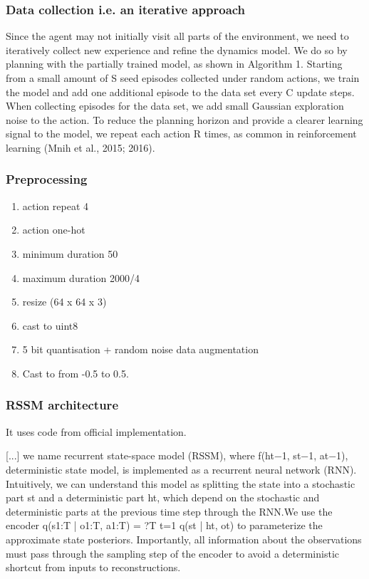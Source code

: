 \subsubsection{Data collection i.e. an iterative approach}
Since the agent may not initially visit all parts of the environment, we need to iteratively collect new experience and refine the dynamics model. We do so by planning with the partially trained model, as shown in Algorithm 1. Starting from a small amount of S seed episodes collected under random actions, we train the model and add one additional episode to the data set every C update steps. When collecting episodes for the data set, we add small Gaussian exploration noise to the action. To reduce the planning horizon and provide a clearer learning signal to the model, we repeat each action R times, as common in reinforcement learning (Mnih et al., 2015; 2016).

\subsubsection{Preprocessing}
\begin{enumerate}
\item action repeat 4
\item action one-hot
\item minimum duration 50
\item maximum duration 2000/4
\item resize (64 x 64 x 3)
\item cast to uint8
\item 5 bit quantisation + random noise data augmentation
\item Cast to from -0.5 to 0.5.
  
\end{enumerate}

\subsubsection{RSSM architecture}
It uses code from official implementation.


[...] we name recurrent state-space model (RSSM), where f(ht−1, st−1, at−1), deterministic state model, is implemented as a recurrent neural network (RNN). Intuitively, we can understand this model as splitting the state into a stochastic part st and a deterministic part ht, which depend on the stochastic and deterministic parts at the previous time step through the RNN.We use the encoder q(s1:T | o1:T, a1:T) =
?T t=1 q(st | ht, ot) to parameterize the approximate state posteriors. Importantly, all information about the observations must pass through the sampling step of the encoder to avoid a deterministic shortcut from inputs to reconstructions.

